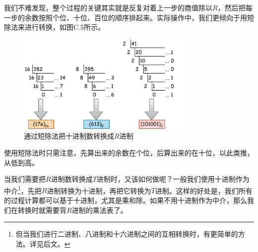 我们不难发现，整个过程的关键其实就是反复对着上一步的商值除以$R$，然后把每一步的余数按照个位、十位、百位的顺序排起来。实际操作中，我们更倾向于用短除法来进行转换，如图C.5所示。\par
\begin{figure}[htbp]
    \centering
    \includegraphics[width=0.75\textwidth]{../images/other_parts/C_short_division.png}
    \caption{通过短除法把十进制数转换成$R$进制}
\end{figure}
使用短除法时只需注意，先算出来的余数在个位，后算出来的在十位，以此类推，从低到高。\par
当我们需要把$R$进制数转换成$T$进制时，又该如何做呢？一般我们使用十进制作为中介\footnote{但当我们进行二进制、八进制和十六进制之间的互相转换时，有更简单的方法。详见后文。}，先把$R$进制转换为十进制，再把它转换为$T$进制。这样的好处是，我们所有的过程计算都可以基于十进制，尤其是乘和除。如果不用十进制作为中介，那么我们在转换时就需要背$R$进制的乘法表了。\par
